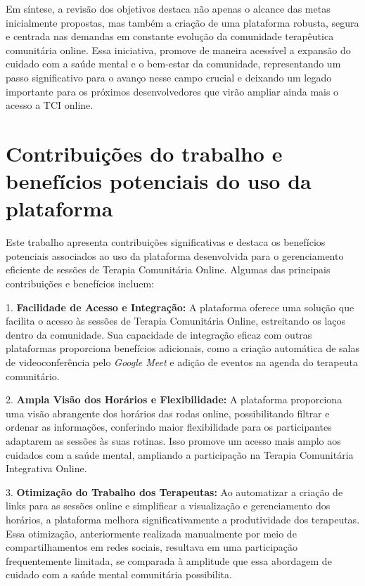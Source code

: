     Em síntese, a revisão dos objetivos destaca não apenas o alcance das metas inicialmente propostas, mas também a criação de uma plataforma robusta, segura e centrada nas demandas em constante evolução da comunidade terapêutica comunitária online. Essa iniciativa, promove de maneira acessível a expansão do cuidado com a saúde mental e o bem-estar da comunidade, representando um passo significativo para o avanço nesse campo crucial e deixando um legado importante para os próximos desenvolvedores que virão ampliar ainda mais o acesso a TCI online.

\section{Contribuições do trabalho e benefícios potenciais do uso da plataforma}
    Este trabalho apresenta contribuições significativas e destaca os benefícios potenciais associados ao uso da plataforma desenvolvida para o gerenciamento eficiente de sessões de Terapia Comunitária Online. Algumas das principais contribuições e benefícios incluem:
    
    1. \textbf{Facilidade de Acesso e Integração:}
       A plataforma oferece uma solução que facilita o acesso às sessões de Terapia Comunitária Online, estreitando os laços dentro da comunidade. Sua capacidade de integração eficaz com outras plataformas proporciona benefícios adicionais, como a criação automática de salas de videoconferência pelo \textit{Google Meet} e adição de eventos na agenda do terapeuta comunitário.
    
    2. \textbf{Ampla Visão dos Horários e Flexibilidade:}
       A plataforma proporciona uma visão abrangente dos horários das rodas online, possibilitando filtrar e ordenar as informações, conferindo maior flexibilidade para os participantes adaptarem as sessões às suas rotinas. Isso promove um acesso mais amplo aos cuidados com a saúde mental, ampliando a participação na Terapia Comunitária Integrativa Online.
    
    3. \textbf{Otimização do Trabalho dos Terapeutas:}
       Ao automatizar a criação de links para as sessões online e simplificar a visualização e gerenciamento dos horários, a plataforma melhora significativamente a produtividade dos terapeutas. Essa otimização, anteriormente realizada manualmente por meio de compartilhamentos em redes sociais, resultava em uma participação frequentemente limitada, se comparada à amplitude que essa abordagem de cuidado com a saúde mental comunitária possibilita.
    
